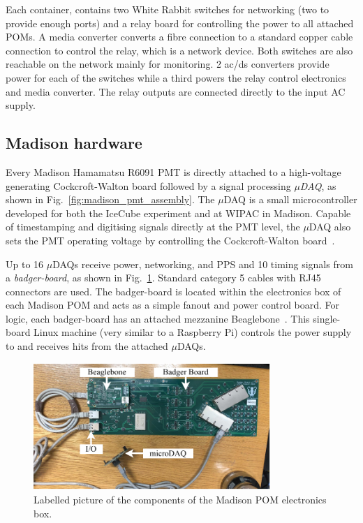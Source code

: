 Each container, contains two White Rabbit switches for networking (two to provide enough ports)
and a relay board for controlling the power to all attached POMs. A media converter converts a
fibre connection to a standard copper cable connection to control the relay, which is a network
device. Both switches are also reachable on the network mainly for monitoring. 2 ac/ds converters
provide power for each of the switches while a third powers the relay control electronics and
media converter. The relay outputs are connected directly to the input AC supply.

\subsection{Madison hardware} %
\label{sec:daq_hard_madison} %

Every Madison Hamamatsu R6091 PMT is directly attached to a high-voltage generating
Cockcroft-Walton board followed by a signal processing \emph{$\mu$DAQ}, as shown in
Fig.~\ref{fig:madison_pmt_assembly}. The $\mu$DAQ is a small microcontroller developed for both
the IceCube experiment and \chips at WIPAC in Madison. Capable of timestamping and digitising
signals directly at the PMT level, the $\mu$DAQ also sets the PMT operating voltage by controlling
the Cockcroft-Walton board~\cite{eijk2018}.

Up to 16 $\mu$DAQs receive power, networking, and PPS and \unit{10}{} timing signals
from a \emph{badger-board}, as shown in Fig.~\ref{fig:madison_plane}. Standard category 5 cables
with RJ45 connectors are used. The badger-board is located within the electronics box of each
Madison POM and acts as a simple fanout and power control board. For logic, each badger-board has
an attached mezzanine Beaglebone~\cite{beagle2020}. This single-board Linux machine (very similar
to a Raspberry Pi) controls the power supply to and receives hits from the attached $\mu$DAQs.

\begin{figure} %
    \includegraphics[width=0.8\textwidth]{diagrams/5-daq/madison_plane.pdf}
    \caption[Labelled picture of the components of the Madison POM electronics box.]
    {Labelled picture of the components of the Madison POM electronics box.}
    \label{fig:madison_plane}
\end{figure}

